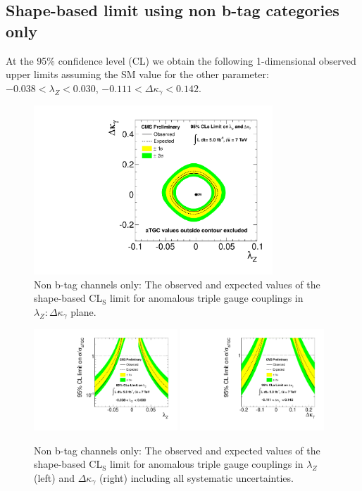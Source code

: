 \subsection{Shape-based limit using non b-tag categories only}
At the 95\% confidence level (CL) 
we obtain the following 1-dimensional observed upper limits 
assuming the SM value for the other parameter: 
$ -0.038 < \lambda_Z < 0.030$, 
$ -0.111 < \Delta{\kappa_\gamma} < 0.142$.

\begin{figure}[bthp]
\includegraphics[width=0.8\textwidth]{figs/lz_dkg_2dlimit2ch.pdf}
\caption{\label{fig:limitshape2d2ch}
Non b-tag channels only: The observed and expected values of the shape-based  CL${}_{\textrm{S}}$ limit for 
anomalous triple gauge couplings in $\lambda_Z:\Delta{\kappa_\gamma}$ plane.
}
\end{figure}
\begin{figure}[bthp]
\includegraphics[width=0.48\textwidth]{figs/lz_1dlimit2ch.pdf}
\includegraphics[width=0.48\textwidth]{figs/dkg_1dlimit2ch.pdf}
\caption{\label{fig:limitshape1d2ch}
Non b-tag channels only: The observed and expected values of the shape-based  CL${}_{\textrm{S}}$ limit for 
anomalous triple gauge couplings in $\lambda_Z$ (left) and $\Delta{\kappa_\gamma}$ (right)
including all systematic uncertainties.
}
\end{figure}


\clearpage
